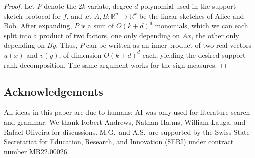 \documentclass{article}
\begin{document}
\begin{proof}
    Let $P$ denote the $2k$-variate, degree-$d$ polynomial used in the support-sketch protocol for $f$, and let $A,B\colon \mathbb{R}^n\to \mathbb{R}^k$ be the linear sketches of Alice and Bob.
    After expanding, $P$ is a sum of $O(k+d)^d$ monomials, which we can each split into a product of two factors, one only depending on $Ax$, the other only depending on $By$. Thus, $P$ can be written as an inner product of two real vectors $u(x)$ and $v(y)$, of dimension $O(k+d)^d$ each, yielding the desired support-rank decomposition. The same argument works for the sign-measures.
\end{proof}


\smallskip 
\subsection*{Acknowledgements}
All ideas in this paper are due to humans; AI was only used for literature search and grammar.
We thank Robert Andrews, Nathan Harms, William Lauga, and Rafael Oliveira for discussions.
M.G.\ and A.S.\ are supported by the Swiss State Secretariat for Education, Research, and Innovation (SERI) under contract number MB22.00026.
\smallskip 



\end{document}
